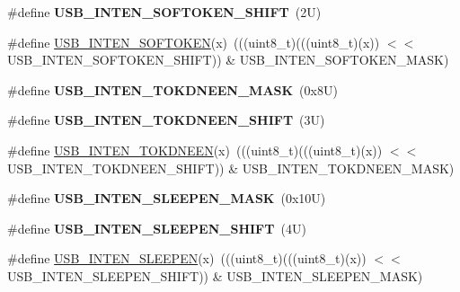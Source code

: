 \begin{DoxyCompactItemize}
\item 
\mbox{\label{group___u_s_b___register___masks_ga8d9738dcc6d852ffd09dbac5e8058431}} 
\#define {\bfseries U\+S\+B\+\_\+\+I\+N\+T\+E\+N\+\_\+\+S\+O\+F\+T\+O\+K\+E\+N\+\_\+\+S\+H\+I\+FT}~(2\+U)
\item 
\#define \mbox{\hyperlink{group___u_s_b___register___masks_ga18c02f9334adbb0d5221e89b7a38279d}{U\+S\+B\+\_\+\+I\+N\+T\+E\+N\+\_\+\+S\+O\+F\+T\+O\+K\+EN}}(x)~(((uint8\+\_\+t)(((uint8\+\_\+t)(x)) $<$$<$ U\+S\+B\+\_\+\+I\+N\+T\+E\+N\+\_\+\+S\+O\+F\+T\+O\+K\+E\+N\+\_\+\+S\+H\+I\+FT)) \& U\+S\+B\+\_\+\+I\+N\+T\+E\+N\+\_\+\+S\+O\+F\+T\+O\+K\+E\+N\+\_\+\+M\+A\+SK)
\item 
\mbox{\label{group___u_s_b___register___masks_ga59b367a1e2496ad06deee9d86001aa7d}} 
\#define {\bfseries U\+S\+B\+\_\+\+I\+N\+T\+E\+N\+\_\+\+T\+O\+K\+D\+N\+E\+E\+N\+\_\+\+M\+A\+SK}~(0x8\+U)
\item 
\mbox{\label{group___u_s_b___register___masks_ga2e0c8229886bcca7e35bee00cd90d236}} 
\#define {\bfseries U\+S\+B\+\_\+\+I\+N\+T\+E\+N\+\_\+\+T\+O\+K\+D\+N\+E\+E\+N\+\_\+\+S\+H\+I\+FT}~(3\+U)
\item 
\#define \mbox{\hyperlink{group___u_s_b___register___masks_ga44ac403f2bcc92e328bbd667ecbc3cda}{U\+S\+B\+\_\+\+I\+N\+T\+E\+N\+\_\+\+T\+O\+K\+D\+N\+E\+EN}}(x)~(((uint8\+\_\+t)(((uint8\+\_\+t)(x)) $<$$<$ U\+S\+B\+\_\+\+I\+N\+T\+E\+N\+\_\+\+T\+O\+K\+D\+N\+E\+E\+N\+\_\+\+S\+H\+I\+FT)) \& U\+S\+B\+\_\+\+I\+N\+T\+E\+N\+\_\+\+T\+O\+K\+D\+N\+E\+E\+N\+\_\+\+M\+A\+SK)
\item 
\mbox{\label{group___u_s_b___register___masks_gac2cf7613141a7333e152b43e42e6ee53}} 
\#define {\bfseries U\+S\+B\+\_\+\+I\+N\+T\+E\+N\+\_\+\+S\+L\+E\+E\+P\+E\+N\+\_\+\+M\+A\+SK}~(0x10\+U)
\item 
\mbox{\label{group___u_s_b___register___masks_ga8e3c25dd5e743c21fc277d45640d5a5e}} 
\#define {\bfseries U\+S\+B\+\_\+\+I\+N\+T\+E\+N\+\_\+\+S\+L\+E\+E\+P\+E\+N\+\_\+\+S\+H\+I\+FT}~(4\+U)
\item 
\#define \mbox{\hyperlink{group___u_s_b___register___masks_ga11c1e1ba0d238744202095c978088a8a}{U\+S\+B\+\_\+\+I\+N\+T\+E\+N\+\_\+\+S\+L\+E\+E\+P\+EN}}(x)~(((uint8\+\_\+t)(((uint8\+\_\+t)(x)) $<$$<$ U\+S\+B\+\_\+\+I\+N\+T\+E\+N\+\_\+\+S\+L\+E\+E\+P\+E\+N\+\_\+\+S\+H\+I\+FT)) \& U\+S\+B\+\_\+\+I\+N\+T\+E\+N\+\_\+\+S\+L\+E\+E\+P\+E\+N\+\_\+\+M\+A\+SK)
$$
\end{DoxyCompactItemize}
